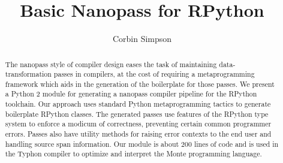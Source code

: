 \documentclass[sigconf, 10pt]{acmart}
\begin{document}
\title{Basic Nanopass for RPython}


\author{Corbin Simpson}


\begin{abstract}
The nanopass style of compiler design eases the task of maintaining
data-transformation passes in compilers, at the cost of requiring a
metaprogramming framework which aids in the generation of the boilerplate for
those passes. We present a Python 2 module for generating a nanopass compiler
pipeline for the RPython toolchain. Our approach uses standard Python
metaprogramming tactics to generate boilerplate RPython classes. The generated
passes use features of the RPython type system to enforce a modicum of
correctness, preventing certain common programmer errors. Passes also have
utility methods for raising error contexts to the end user and handling source
span information. Our module is about 200 lines of code and is used in the
Typhon compiler to optimize and interpret the Monte programming language.
\end{abstract}








\maketitle
\end{document}
